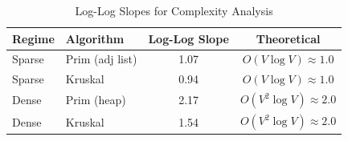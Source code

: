 \begin{table}[H]
    \centering
    \small
    \begin{tabular}{|l|l|c|c|}
    \hline
    \textbf{Regime} & \textbf{Algorithm} & \textbf{Log-Log Slope} & \textbf{Theoretical} \\
    \hline
        Sparse & Prim (adj list) & 1.07 & $O(V \log V) \approx 1.0$ \\
        Sparse & Kruskal & 0.94 & $O(V \log V) \approx 1.0$ \\
        Dense & Prim (heap) & 2.17 & $O(V^2 \log V) \approx 2.0$ \\
        Dense & Kruskal & 1.54 & $O(V^2 \log V) \approx 2.0$ \\
    \hline
    \end{tabular}
    \caption{Log-Log Slopes for Complexity Analysis}
    \label{tab:complexity}
\end{table}